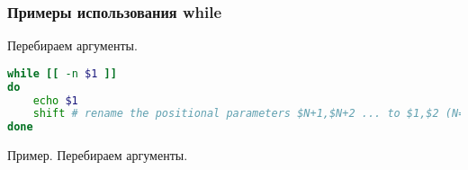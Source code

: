 \begin{frame}[fragile]
\frametitle{Примеры использования while}

\begin{block}{Перебираем аргументы.}
\begin{lstlisting}[language=bash,frame=single]
while [[ -n $1 ]]
do
    echo $1
    shift # rename the positional parameters $N+1,$N+2 ... to $1,$2 (N=1)
done
\end{lstlisting}
\end{block}

\begin{block}{Пример. Перебираем аргументы.}

\end{block}
\end{frame}


